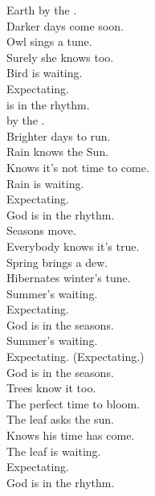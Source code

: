


Earth by the . \\
Darker days come soon. \\
Owl sings a tune. \\
Surely she knows too. \\

Bird is waiting. \\
Expectating. \\
 is in the rhythm. \\

 by the . \\
Brighter days to run. \\
Rain knows the Sun. \\
Knows it's not time to come. \\

Rain is waiting. \\
Expectating. \\
God is in the rhythm. \\

Seasons move. \\
Everybody knows it's true. \\
Spring brings a dew. \\
Hibernates winter's tune. \\

Summer's waiting. \\
Expectating. \\
God is in the seasons. \\

Summer's waiting. \\
Expectating. (Expectating.) \\
God is in the seasons. \\

Trees know it too. \\
The perfect time to bloom. \\
The leaf asks the sun. \\
Knows his time has come. \\

The leaf is waiting. \\
Expectating. \\
God is in the rhythm. \\

